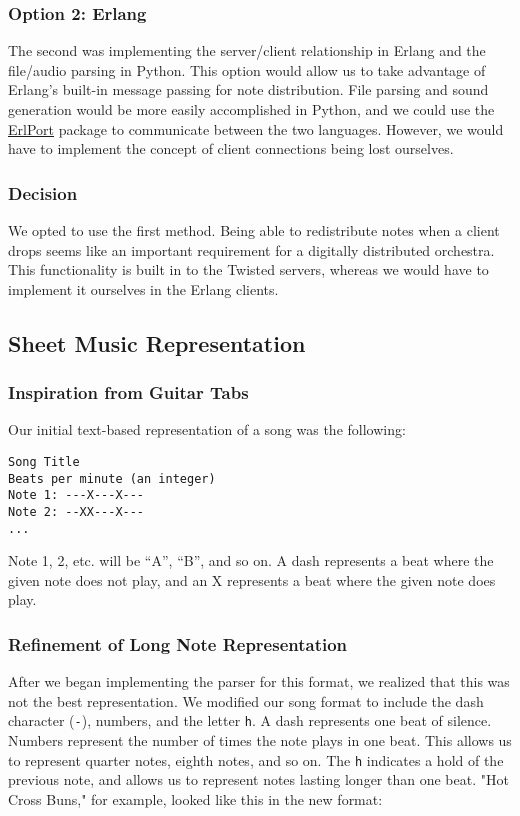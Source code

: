 \documentclass[12pt, letterpaper]{article}
\begin{document}
\subsubsection{Option 2: Erlang}
The second was implementing the server/client relationship in Erlang and the file/audio parsing in
Python. This option would allow us to take advantage of Erlang’s built-in message passing for note
distribution. File parsing and sound generation would be more easily accomplished in Python, and we
could use the \href{http://erlport.org/docs/python.html}{ErlPort} package to communicate between the
two languages. However, we would have to implement the concept of client connections being lost
ourselves.
            
\subsubsection{Decision}
We opted to use the first method. Being able to redistribute notes when a client drops seems like an
important requirement for a digitally distributed orchestra. This functionality is built in to the
Twisted servers, whereas we would have to implement it ourselves in the Erlang clients.

\subsection{Sheet Music Representation}
        
\subsubsection{Inspiration from Guitar Tabs}
Our initial text-based representation of a song was the following:
            
\begin{verbatim}
Song Title
Beats per minute (an integer)
Note 1: ---X---X---
Note 2: --XX---X---
...
\end{verbatim}
            
Note 1, 2, etc. will be “A”, “B”, and so on. A dash represents a beat where the given note does not
play, and an X represents a beat where the given note does play.
            
\subsubsection{Refinement of Long Note Representation}
After we began implementing the parser for this format, we realized that this was not the best
representation. We modified our song format to include the dash character (\texttt{-}), numbers, and
the letter \texttt{h}. A dash represents one beat of silence. Numbers represent the number of times
the note plays in one beat. This allows us to represent quarter notes, eighth notes, and so on. The
\texttt{h} indicates a hold of the previous note, and allows us to represent notes lasting longer
than one beat. "Hot Cross Buns," for example, looked like this in the new format:
            
\end{document}

